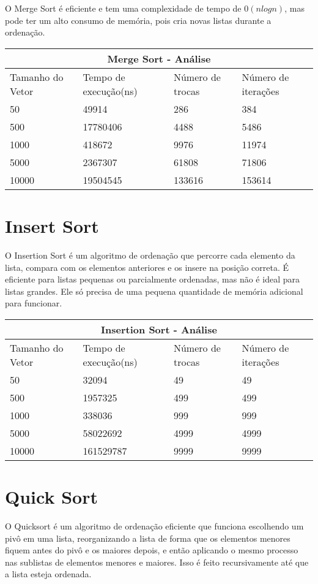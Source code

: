 \documentclass[12pt]{article}
\begin{document}
    O Merge Sort é eficiente e tem uma complexidade de tempo de \(0(nlogn)\), mas pode ter um alto consumo de memória, pois cria novas listas durante a ordenação.
    \begin{tabular}{ |p{3cm}||p{3cm}|p{3cm}|p{3cm}|  }
        \hline
        \multicolumn{4}{|c|}{Merge Sort - Análise} \\
        \hline
        Tamanho do Vetor & Tempo de execução(ns) &Número de trocas & Número de iterações\\
        \hline
        50&49914&286&384\\
        500&17780406&4488&5486\\
        1000&418672&9976&11974\\
        5000&2367307&61808&71806\\
        10000&19504545&133616&153614\\
        \hline
    \end{tabular}

    \section{Insert Sort}

    O Insertion Sort é um algoritmo de ordenação que percorre cada elemento da lista, compara com os elementos anteriores e os insere na posição correta. É eficiente para listas pequenas ou parcialmente ordenadas, mas não é ideal para listas grandes. Ele só precisa de uma pequena quantidade de memória adicional para funcionar.

    \begin{tabular}{ |p{3cm}||p{3cm}|p{3cm}|p{3cm}|  }
        \hline
        \multicolumn{4}{|c|}{Insertion Sort - Análise} \\
        \hline
        Tamanho do Vetor & Tempo de execução(ns) &Número de trocas & Número de iterações\\
        \hline
        50&32094&49&49\\
        500&1957325&499&499\\
        1000&338036&999&999\\
        5000&58022692&4999&4999\\
        10000&161529787&9999&9999\\
        \hline
    \end{tabular}

    \section{Quick Sort}
    O Quicksort é um algoritmo de ordenação eficiente que funciona escolhendo um pivô em uma lista, reorganizando a lista de forma que os elementos menores fiquem antes do pivô e os maiores depois, e então aplicando o mesmo processo nas sublistas de elementos menores e maiores. Isso é feito recursivamente até que a lista esteja ordenada.
\end{document}
